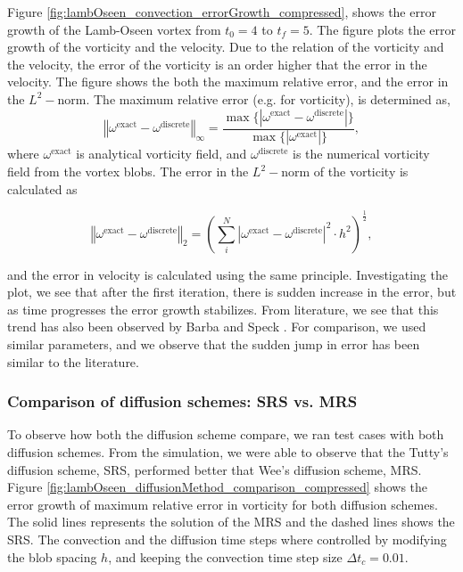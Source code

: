 Figure \ref{fig:lambOseen_convection_errorGrowth_compressed}, shows the error growth of the Lamb-Oseen vortex from $t_0=4$ to $t_f=5$. The figure plots the error growth of the vorticity and the velocity. Due to the relation of the vorticity and the velocity, the error of the vorticity is an order higher that the error in the velocity. The figure shows the both the maximum relative error, and the error in the $L^2-\mathrm{norm}$. The maximum relative error (e.g. for vorticity), is determined as,
	\begin{equation}
	\left\Vert \omega^{\mathrm{exact}} - \omega^{\mathrm{discrete}} \right\Vert_{\infty} = \frac{\max\{\left|\omega^{\mathrm{exact}} - \omega^{\mathrm{discrete}}\right|\}}{\max\{\left|\omega^{\mathrm{exact}}\right|\}},
	\end{equation}
where $\omega^{\mathrm{exact}}$ is analytical vorticity field, and $\omega^{\mathrm{discrete}}$ is the numerical vorticity field from the vortex blobs. The error in the $L^2-\mathrm{norm}$ of the vorticity is calculated as 

	\begin{equation}
	\left\Vert \omega^{\mathrm{exact}} - \omega^{\mathrm{discrete}} \right\Vert_2 = \left(\sum_{i}^{N}\left| \omega^{\mathrm{exact}} - \omega^{\mathrm{discrete}} \right|^2 \cdot h^2\right)^{\frac{1}{2}},
	\end{equation}

and the error in velocity is calculated using the same principle. Investigating the plot, we see that after the first iteration, there is sudden increase in the error, but as time progresses the error growth stabilizes. From literature, we see that this trend has also been observed by Barba \cite{Barba2004c} and Speck \cite{Speck2011a}. For comparison, we used similar parameters, and we observe that the sudden jump in error has been similar to the literature.
	
\subsubsection*{Comparison of diffusion schemes: SRS vs. MRS}

To observe how both the diffusion scheme compare, we ran test cases with both diffusion schemes. From the simulation, we were able to observe that the Tutty's diffusion scheme, SRS, performed better that Wee's diffusion scheme, MRS. Figure \ref{fig:lambOseen_diffusionMethod_comparison_compressed} shows the error growth of maximum relative error in vorticity for both diffusion schemes. The solid lines represents the solution of the MRS and the dashed lines shows the SRS. The convection and the diffusion time steps where controlled by modifying the blob spacing $h$, and keeping the convection time step size $\Delta t_c = 0.01$. 

